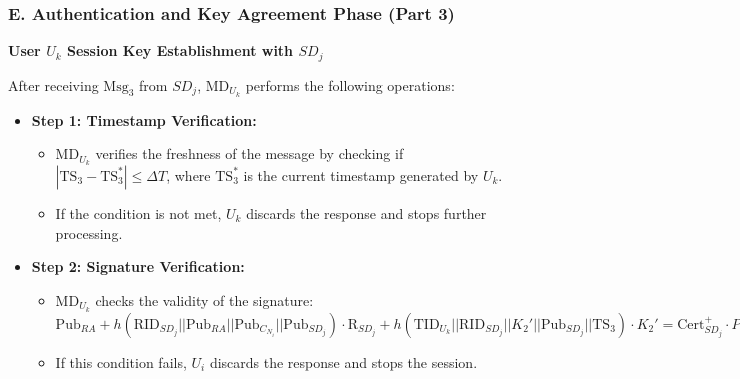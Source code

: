 \documentclass[9pt,handout]{beamer}
\begin{document}
\begin{frame}
    \frametitle{E. Authentication and Key Agreement Phase (Part 3)}

    \textbf{User \( U_k \) Session Key Establishment with \( SD_j \)}

    
    \text After receiving \(\text{Msg}_3\) from \( SD_j \), \( \text{MD}_{U_k} \) performs the following operations:
        \begin{itemize}
            \item \textbf{Step 1: Timestamp Verification:}
            \begin{itemize}
                \item \( \text{MD}_{U_k} \) verifies the freshness of the message by checking if \( |\text{TS}_3 - \text{TS}^*_3| \leq \Delta T \), where \( \text{TS}^*_3 \) is the current timestamp generated by \( U_k \).
                \item If the condition is not met, \( U_k \) discards the response and stops further processing.
            \end{itemize}

            \item \textbf{Step 2: Signature Verification:}
            \begin{itemize}
                \item \( \text{MD}_{U_k} \) checks the validity of the signature:
                \(
                \text{Pub}_{RA} + h(\text{RID}_{SD_j} || \text{Pub}_{RA} || \text{Pub}_{C_{N_i}} || \text{Pub}_{SD_j}) \cdot \text{R}_{SD_j} + h(\text{TID}_{U_k} || \text{RID}_{SD_j} || K_2' || \text{Pub}_{SD_j} || \text{TS}_3) \cdot K_2' = \text{Cert}^+_{SD_j} \cdot P
                \)
                \item If this condition fails, \( U_i \) discards the response and stops the session.
            \end{itemize}

            
        \end{itemize}
   
\end{frame}
\end{document}
